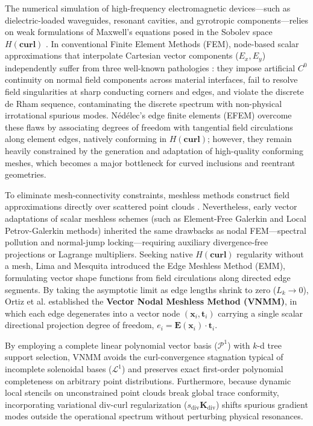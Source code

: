 \documentclass[11pt,a4paper]{article}
\begin{document}
The numerical simulation of high-frequency electromagnetic devices---such as dielectric-loaded waveguides, resonant cavities, and gyrotropic components---relies on weak formulations of Maxwell's equations posed in the Sobolev space $H(\mathbf{curl})$ \cite{harrington2001,collin1991}. In conventional Finite Element Methods (FEM), node-based scalar approximations that interpolate Cartesian vector components ($E_x, E_y$) independently suffer from three well-known pathologies \cite{jin2014}: they impose artificial $C^0$ continuity on normal field components across material interfaces, fail to resolve field singularities at sharp conducting corners and edges, and violate the discrete de Rham sequence, contaminating the discrete spectrum with non-physical irrotational spurious modes. N\'ed\'elec's edge finite elements (EFEM) overcome these flaws by associating degrees of freedom with tangential field circulations along element edges, natively conforming in $H(\mathbf{curl})$; however, they remain heavily constrained by the generation and adaptation of high-quality conforming meshes, which becomes a major bottleneck for curved inclusions and reentrant geometries.

To eliminate mesh-connectivity constraints, meshless methods construct field approximations directly over scattered point clouds \cite{belytschko1994}. Nevertheless, early vector adaptations of scalar meshless schemes (such as Element-Free Galerkin and Local Petrov-Galerkin methods) inherited the same drawbacks as nodal FEM---spectral pollution and normal-jump locking---requiring auxiliary divergence-free projections or Lagrange multipliers. Seeking native $H(\mathbf{curl})$ regularity without a mesh, Lima and Mesquita \cite{lima2017} introduced the Edge Meshless Method (EMM), formulating vector shape functions from field circulations along directed edge segments. By taking the asymptotic limit as edge lengths shrink to zero ($L_k \to 0$), Ortiz et al. \cite{ortiz2021,ortiz2023} established the \textbf{Vector Nodal Meshless Method (VNMM)}, in which each edge degenerates into a vector node $(\mathbf{x}_i, \mathbf{t}_i)$ carrying a single scalar directional projection degree of freedom, $e_i = \mathbf{E}(\mathbf{x}_i)\cdot\mathbf{t}_i$.

By employing a complete linear polynomial vector basis ($\mathcal{P}^1$) with $k$-d tree support selection, VNMM avoids the curl-convergence stagnation typical of incomplete solenoidal bases ($\mathcal{L}^1$) and preserves exact first-order polynomial completeness on arbitrary point distributions. Furthermore, because dynamic local stencils on unconstrained point clouds break global trace conformity, incorporating variational div-curl regularization ($s_{\mathrm{div}}\mathbf{K}_{\mathrm{div}}$) shifts spurious gradient modes outside the operational spectrum without perturbing physical resonances.
\end{document}
